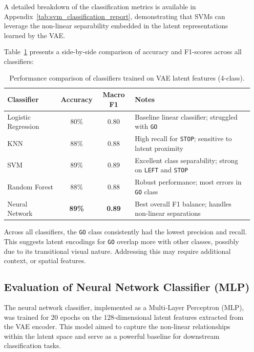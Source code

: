 A detailed breakdown of the classification metrics is available in Appendix~\ref{tab:svm_classification_report}, demonstrating that SVMs can leverage the non-linear separability embedded in the latent representations learned by the VAE.




Table~\ref{tab:classifier_comparison} presents a side-by-side comparison of accuracy and F1-scores across all classifiers:

\begin{table}[htbp]
\centering
\small
\begin{tabular}{p{3cm}ccp{5.5cm}}
\toprule
\textbf{Classifier} & \textbf{Accuracy} & \textbf{Macro F1} & \textbf{Notes} \\
\midrule
Logistic Regression & 80\% & 0.80 & Baseline linear classifier; struggled with \texttt{GO} \\
KNN & 88\% & 0.88 & High recall for \texttt{STOP}; sensitive to latent proximity \\
SVM & 89\% & 0.89 & Excellent class separability; strong on \texttt{LEFT} and \texttt{STOP} \\
Random Forest & 88\% & 0.88 & Robust performance; most errors in \texttt{GO} class \\
Neural Network & \textbf{89\%} & \textbf{0.89} & Best overall F1 balance; handles non-linear separations \\
\bottomrule
\end{tabular}
\caption{Performance comparison of classifiers trained on VAE latent features (4-class).}
\label{tab:classifier_comparison}
\end{table}


Across all classifiers, the \texttt{GO} class consistently had the lowest precision and recall. This suggests latent encodings for \texttt{GO} overlap more with other classes, possibly due to its transitional visual nature. Addressing this may require additional context, or spatial features.


\subsection{Evaluation of Neural Network Classifier (MLP)}
\label{subsec:classifier_trained_on_latentfeatures}

The neural network classifier, implemented as a Multi-Layer Perceptron (MLP), was trained for 20 epochs on the 128-dimensional latent features extracted from the VAE encoder. This model aimed to capture the non-linear relationships within the latent space and serve as a powerful baseline for downstream classification tasks.

